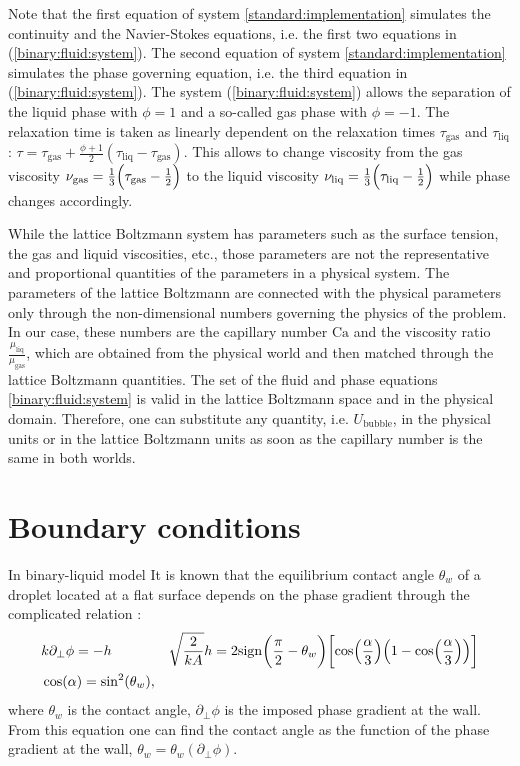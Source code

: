 \documentclass{article}
\newcommand{\Ca}{\mathrm{Ca}}
\newcommand{\beqal}{\begin{equation}\begin{aligned}}
\newcommand{\feqal}{\end{aligned}\end{equation}}
\begin{document}
Note that the first equation of system \ref{standard:implementation} simulates the continuity and
the Navier-Stokes equations, i.e. the first two equations in (\ref{binary:fluid:system}). The second
equation
of system \ref{standard:implementation} simulates the phase governing equation, i.e. the third
equation in
(\ref{binary:fluid:system}). The system (\ref{binary:fluid:system}) allows the separation of the
liquid
phase with $\phi=1$ and a so-called gas phase with $\phi=-1$. The
relaxation time is taken as linearly dependent on the relaxation
times $\tau_{\mathrm{gas}}$ and $\tau_{\mathrm{liq}}$:
$\tau=\tau_{\mathrm{gas}}+\frac{\phi+1}{2}(\tau_{\mathrm{liq}}-\tau_{\mathrm{gas}})$. This allows
to change viscosity from the gas viscosity
$\nu_{\mathrm{gas}}=\frac{1}{3}\Bigl(\tau_{\mathrm{gas}}-\frac{1}{2}\Bigr)$ to the liquid viscosity
$\nu_{\mathrm{liq}}=\frac{1}{3}\Bigl(\tau_{\mathrm{liq}}-\frac{1}{2}\Bigr)$ while phase changes
accordingly.

While the lattice Boltzmann system has parameters such as the surface tension, the gas and liquid
viscosities, etc., those parameters are not the representative and
proportional quantities of the parameters in a physical system. The parameters of the lattice
Boltzmann are connected with the physical parameters only through the non-dimensional
numbers governing the physics of the problem. In our case, these numbers are the capillary number $\Ca$ and the
viscosity ratio $\frac{\mu_{\mathrm{liq}}}{\mu_{\mathrm{gas}}}$, which are
obtained from the physical world and then matched through the lattice Boltzmann quantities.
 The set of
the fluid and phase equations \eqref{binary:fluid:system} is valid in the lattice Boltzmann space
and in the physical domain. Therefore, one can substitute any quantity, i.e.
$U_{\mathrm{bubble}}$, in the physical units or in the lattice Boltzmann units as soon as the
capillary number is the same in both worlds.
\section{Boundary conditions}
In binary-liquid model It is known that the equilibrium contact angle $\theta_{w}$ of a droplet located at a flat surface depends on the phase gradient through the complicated relation \cite{briant-contact-line}:
\beqal
&k \partial_{\perp} \phi = - h
&\sqrt{\frac{2}{k A}}h= 2 \mathrm{sign}\biggl(\frac{\pi}{2}-\theta_w\biggr) \biggl[\cos\Bigl(\frac{\alpha}{3}\Bigr)\Bigl(1-\cos\Bigl(\frac{\alpha}{3}\Bigr)\Bigr)\biggr]\\
&\cos(\alpha)=\sin^2(\theta_w),
\feqal
where $\theta_w$ is the contact angle, $\partial_{\perp}\phi$ is the imposed phase gradient at the wall. From this equation one can find the contact angle as the function of the phase gradient at the wall, $\theta_w=\theta_w(\partial_{\perp}\phi)$.
\end{document}
